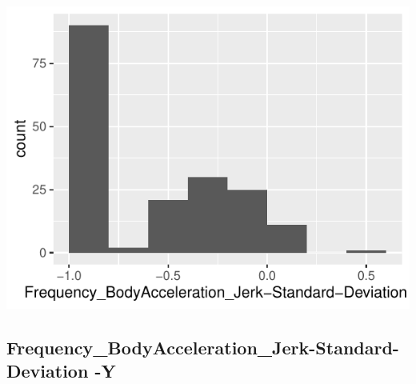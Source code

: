 \documentclass[
]{article}
\begin{document}
\begin{minipage}{0.25 \textwidth}

\includegraphics{codebook_tidydatasub_files/figure-latex/Var-55-Frequency-BodyAcceleration-Jerk-Standard-Deviation--X-1.pdf}

\end{minipage}

\noindent\makebox[\linewidth]{\rule{\textwidth}{0.4pt}}

\hypertarget{frequency_bodyacceleration_jerk-standard-deviation--y}{%
\subsection{Frequency\_BodyAcceleration\_Jerk-Standard-Deviation
-Y}\label{frequency_bodyacceleration_jerk-standard-deviation--y}}
\end{document}
